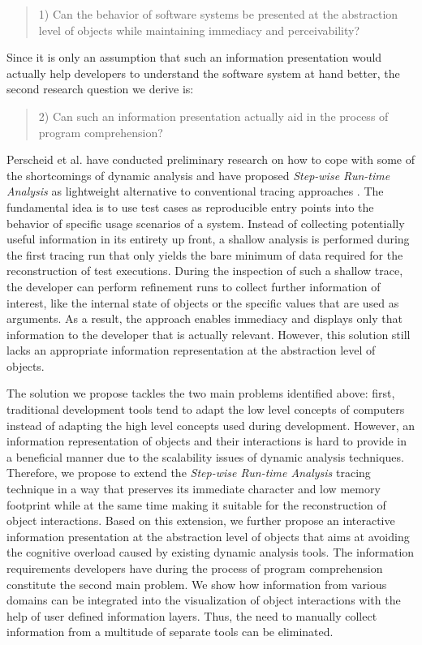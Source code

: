 \begin{quote}
1) Can the behavior of software systems be presented at the abstraction level of objects while maintaining immediacy and perceivability?
\end{quote}

Since it is only an assumption that such an information presentation would actually help developers to understand the software system at hand better, the second research question we derive is:

\begin{quote}
2) Can such an information presentation actually aid in the process of program comprehension?
\end{quote}

Perscheid et al. have conducted preliminary research on how to cope with some of the shortcomings of dynamic analysis and have proposed \emph{Step-wise Run-time Analysis} as lightweight alternative to conventional tracing approaches \cite{perscheid_immediacy_2010}.
The fundamental idea is to use test cases as reproducible entry points into the behavior of specific usage scenarios of a system.
Instead of collecting potentially useful information in its entirety up front, a shallow analysis is performed during the first tracing run that only yields the bare minimum of data required for the reconstruction of test executions.
During the inspection of such a shallow trace, the developer can perform refinement runs to collect further information of interest, like the internal state of objects or the specific values that are used as arguments.
As a result, the approach enables immediacy and displays only that information to the developer that is actually relevant.
However, this solution still lacks an appropriate information representation at the abstraction level of objects.

The solution we propose tackles the two main problems identified above: first, traditional development tools tend to adapt the low level concepts of computers instead of adapting the high level concepts used during development.
However, an information representation of objects and their interactions is hard to provide in a beneficial manner due to the scalability issues of dynamic analysis techniques.
Therefore, we propose to extend the \emph{Step-wise Run-time Analysis} tracing technique in a way that preserves its immediate character and low memory footprint while at the same time making it suitable for the reconstruction of object interactions.
Based on this extension, we further propose an interactive information presentation at the abstraction level of objects that aims at avoiding the cognitive overload caused by existing dynamic analysis tools.
The information requirements developers have during the process of program comprehension constitute the second main problem.
We show how information from various domains can be integrated into the visualization of object interactions with the help of user defined information layers.
Thus, the need to manually collect information from a multitude of separate tools can be eliminated.

